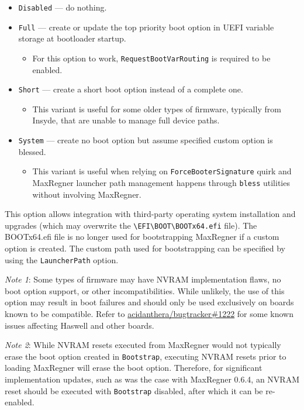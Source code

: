 \documentclass[]{article}
\providecommand{\tightlist}{%
  \setlength{\itemsep}{0pt}\setlength{\parskip}{0pt}}
\begin{document}
\begin{enumerate}
  \begin{itemize}
  \tightlist
  \item \texttt{Disabled} --- do nothing.
  \item \texttt{Full} --- create or update the top priority
  boot option in UEFI variable storage at bootloader startup.
  \begin{itemize}
  \tightlist
    \item For this option to work, \texttt{RequestBootVarRouting} is required to be enabled.
  \end{itemize}
  \item \texttt{Short} --- create a short boot option instead of a complete one.
  \begin{itemize}
  \tightlist
    \item This variant is useful for some older types of firmware, typically from Insyde,
    that are unable to manage full device paths.
  \end{itemize}
  \item \texttt{System} --- create no boot option but assume specified custom option is blessed.
    \begin{itemize}
  \tightlist
    \item This variant is useful when relying on \texttt{ForceBooterSignature} quirk and
    MaxRegner launcher path management happens through \texttt{bless} utilities without
    involving MaxRegner.
  \end{itemize} \medskip
  \end{itemize}

  This option allows integration with third-party operating system installation and upgrades
  (which may overwrite the \texttt{\textbackslash EFI\textbackslash BOOT\textbackslash BOOTx64.efi}
  file). The BOOTx64.efi file is no longer used for bootstrapping MaxRegner if a custom option is created.
  The custom path used for bootstrapping can be specified by using the \texttt{LauncherPath} option.

  \emph{Note 1}: Some types of firmware may have NVRAM implementation flaws, no boot option
  support, or other incompatibilities. While unlikely, the use of this option may result in
  boot failures and should only be used exclusively on boards known to be compatible. Refer to
  \href{https://github.com/acidanthera/bugtracker/issues/1222}{acidanthera/bugtracker\#1222}
  for some known issues affecting Haswell and other boards.

  \emph{Note 2}: While NVRAM resets executed from MaxRegner would not typically erase the boot option
  created in \texttt{Bootstrap}, executing NVRAM resets prior to loading MaxRegner will erase the boot
  option. Therefore, for significant implementation updates, such as was the case with MaxRegner 0.6.4,
  an NVRAM reset should be executed with \texttt{Bootstrap} disabled, after which it can be re-enabled.


\end{enumerate}
\end{document}
